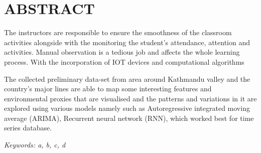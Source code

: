 \newpage

\section*{ABSTRACT}
The instructors are responsible to ensure the smoothness of the classroom activities alongside with the monitoring the student's attendance, attention and activities. Manual observation is a tedious job and affects the whole learning process. With the incorporation of IOT devices and computational algorithms 

The collected preliminary data-set from area around Kathmandu valley and the country's major lines are able to map some interesting features and environmental proxies that are visualised and the patterns and variations in it are explored using various models namely such as Autoregressive integrated moving average (ARIMA), Recurrent neural network (RNN), which worked best for time series database. 



\textit {Keywords:  a, b, c, d }